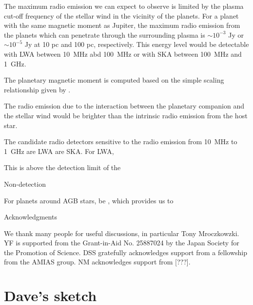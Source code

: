 \documentclass{emulateapj}
\begin{document}
The maximum radio emission we can expect to observe is limited by the plasma cut-off frequency of the stellar wind in the vicinity of the planets. 
For a planet with the same magnetic moment as Jupiter, the maximum radio emission from the planets which can penetrate through the surrounding plasma is $\sim 10^{-3}$ Jy or $\sim 10^{-5}$ Jy at 10 pc and 100 pc, respectively. 
This energy level would be detectable with LWA between 10~MHz abd 100~MHz or with SKA between 100~MHz and 1~GHz. 

The planetary magnetic moment is computed based on the simple scaling relationship given by \citep{christensen2010}. 


The radio emission due to the interaction between the planetary companion and the stellar wind would be brighter than the intrinsic radio emission from the host star. 

The candidate radio detectors sensitive to the radio emission from 10~MHz to 1~GHz are LWA are SKA. For LWA, 

This is above the detection limit of the 

Non-detection 


For planets around AGB stars, be
, which provides us to 


\vspace{0.5in}


{\sc Acknowledgments}

We thank many people for useful discussions, in particular Tony
Mroczkowzki.  YF is supported from the Grant-in-Aid No. 25887024 by the Japan Society for the Promotion of Science. 
DSS gratefully acknowledges support from a fellowship
from the AMIAS group.  NM acknowledges support from [???].







\clearpage


\section{Dave's sketch}

\citep{spiegel2008}

\citep{lecavelier_et_al2013}

\citep{janhunen_et_al2003}
\end{document}
